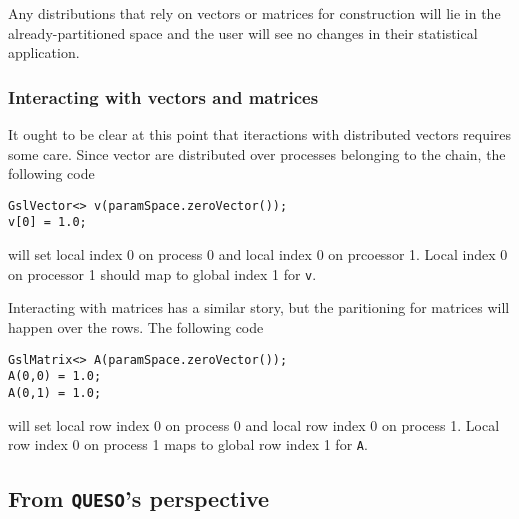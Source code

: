 \documentclass{article}
\newcommand{\Queso}{\texttt{QUESO}}
\begin{document}
Any distributions that rely on vectors or matrices for construction will lie
in the already-partitioned space and the user will see no changes in their
statistical application.

\subsubsection{Interacting with vectors and matrices}

It ought to be clear at this point that iteractions with distributed vectors
requires some care.  Since vector are distributed over processes belonging to
the chain, the following code
\begin{lstlisting}
GslVector<> v(paramSpace.zeroVector());
v[0] = 1.0;
\end{lstlisting}
will set local index 0 on process 0 and local index 0 on prcoessor 1.  Local
index 0 on processor 1 should map to global index 1 for \lstinline|v|.

Interacting with matrices has a similar story, but the paritioning for matrices
will happen over the rows.  The following code
\begin{lstlisting}
GslMatrix<> A(paramSpace.zeroVector());
A(0,0) = 1.0;
A(0,1) = 1.0;
\end{lstlisting}
will set local row index 0 on process 0 and local row index 0 on process 1.
Local row index 0 on process 1 maps to global row index 1 for \lstinline|A|.

\subsection{From \Queso's perspective}
\end{document}
